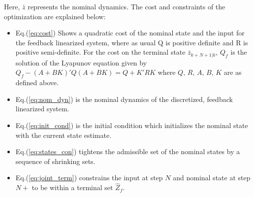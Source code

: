 Here, $\bar{z}$ represents the nominal dynamics. The cost and constraints of the optimization are explained below:
\begin{itemize}
\item Eq.(\ref{eq:cost}) Shows a quadratic cost of the nominal state and the input for the feedback linearized system, where as usual Q is positive definite and R is positive semi-definite. For the cost on the terminal state $\bar{z}_{k+N+1|k}$, $Q_f$ is the solution of the Lyapunov equation given by $Q_f-(A+BK)'Q(A+BK) = Q+K'RK$ where $Q,\,R,\,A,\,B,\,K$ are as defined above.

\item Eq.(\ref{eq:nom_dyn}) is the nominal dynamics of the discretized, feedback linearized system.

\item Eq.(\ref{eq:init_cond}) is the initial condition which initializes the nominal state with the current state estimate.

\item Eq.(\ref{eq:states_con}) tightens the admissible set of the nominal states by a sequence of shrinking sets.

\item Eq.(\ref{eq:joint_term}) constrains the input at step $N$ and nominal state at step $N+$  to be within a terminal set $\hat{Z}_f$.

\end{itemize}



